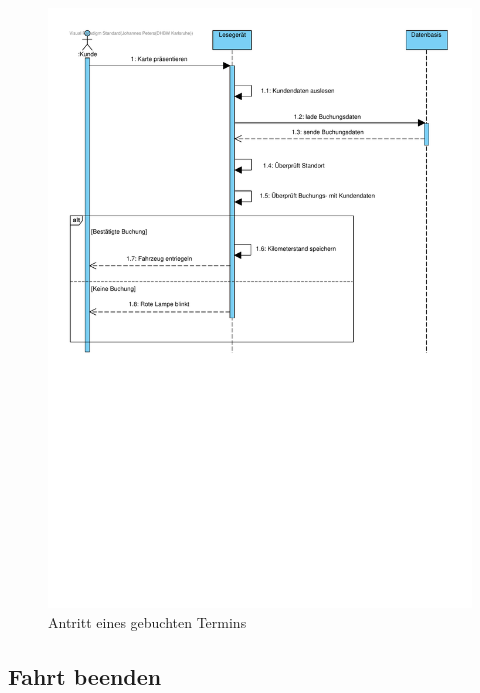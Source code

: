 \begin{figure}[!ht]
    \centering
    \includegraphics[width=\textwidth, trim = 0cm 13cm 0cm 0cm]{Bilder/Diagramme/SD_Buchungsvorgang_02.pdf}
    \caption{Antritt eines gebuchten Termins}
    \label{img:buchung02}
\end{figure}

\newpage

\subsection{Fahrt beenden}

